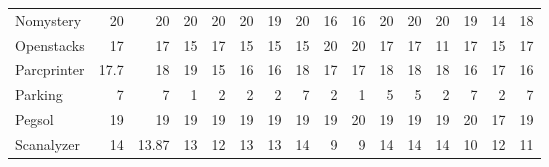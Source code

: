\begin{table}[htb]
\begin{tabular}{lrrrrrrrrrrrrrrr}
Nomystery                & 20                                 & 20              & 20              & 20              & 20              & 19                              & 20                    & 16                   & 16                   & 20                     & 20                     & 20                              & 19                    & 14                      & 18                      \\
Openstacks               & 17                                 & 17              & 15              & 17              & 15              & 15                              & 15                    & 20                   & 20                   & 17                     & 17                     & 11                              & 17                    & 15                      & 17                      \\
Parcprinter              & 17.7                               & 18              & 19              & 15              & 16              & 16                              & 18                    & 17                   & 17                   & 18                     & 18                     & 18                              & 16                    & 17                      & 16                      \\
Parking                  & 7                                  & 7               & 1               & 2               & 2               & 2                               & 7                     & 2                    & 1                    & 5                      & 5                      & 2                               & 7                     & 2                       & 7                       \\
Pegsol                   & 19                                 & 19              & 19              & 19              & 19              & 19                              & 19                    & 19                   & 20                   & 19                     & 19                     & 19                              & 20                    & 17                      & 19                      \\
Scanalyzer               & 14                                 & 13.87           & 13              & 12              & 13              & 13                              & 14                    & 9                    & 9                    & 14                     & 14                     & 14                              & 10                    & 12                      & 11                      \\

\end{tabular}
\end{table}
